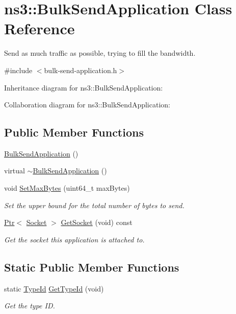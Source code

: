 \hypertarget{classns3_1_1BulkSendApplication}{}\section{ns3\+:\+:Bulk\+Send\+Application Class Reference}
\label{classns3_1_1BulkSendApplication}


Send as much traffic as possible, trying to fill the bandwidth.  




{\ttfamily \#include $<$bulk-\/send-\/application.\+h$>$}



Inheritance diagram for ns3\+:\+:Bulk\+Send\+Application\+:


Collaboration diagram for ns3\+:\+:Bulk\+Send\+Application\+:
\subsection*{Public Member Functions}
\begin{DoxyCompactItemize}
\item 
\hyperlink{classns3_1_1BulkSendApplication_ac353edd318da96e4b01591ef4625a1da}{Bulk\+Send\+Application} ()
\item 
virtual \hyperlink{classns3_1_1BulkSendApplication_ab59dd21a314d29bb6ea87e13003773fa}{$\sim$\+Bulk\+Send\+Application} ()
\item 
void \hyperlink{classns3_1_1BulkSendApplication_af2a496b450d2a0a2ec3d2717c949f1be}{Set\+Max\+Bytes} (uint64\+\_\+t max\+Bytes)
\begin{DoxyCompactList}\small\item\em Set the upper bound for the total number of bytes to send. \end{DoxyCompactList}\item 
\hyperlink{classns3_1_1Ptr}{Ptr}$<$ \hyperlink{classns3_1_1Socket}{Socket} $>$ \hyperlink{classns3_1_1BulkSendApplication_a5954b1d14053e3f482d1b9a331beb245}{Get\+Socket} (void) const 
\begin{DoxyCompactList}\small\item\em Get the socket this application is attached to. \end{DoxyCompactList}\end{DoxyCompactItemize}
\subsection*{Static Public Member Functions}
\begin{DoxyCompactItemize}
\item 
static \hyperlink{classns3_1_1TypeId}{Type\+Id} \hyperlink{classns3_1_1BulkSendApplication_ae019765d0ae807c8072ceee06f7ca66c}{Get\+Type\+Id} (void)
\begin{DoxyCompactList}\small\item\em Get the type ID. \end{DoxyCompactList}\end{DoxyCompactItemize}
